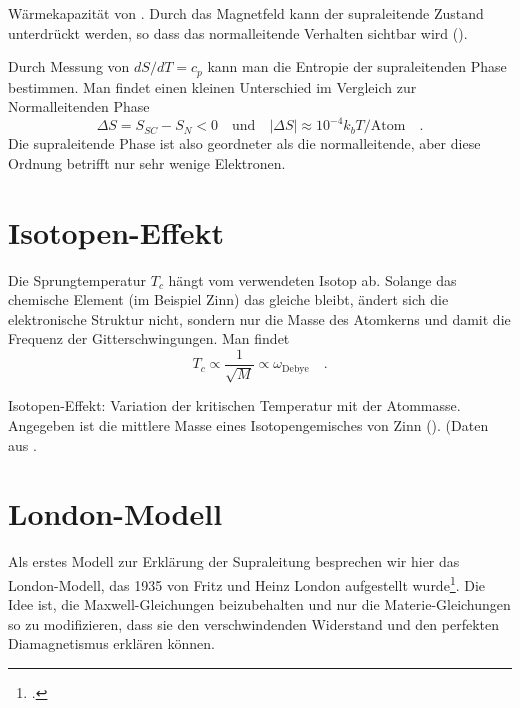 \begin{marginfigure}
    \caption{Wärmekapazität  von . Durch das Magnetfeld kann der supraleitende Zustand unterdrückt werden, so dass das  normalleitende Verhalten sichtbar wird (\cite{Phillips1959}).}
\end{marginfigure}



Durch Messung von $dS/ dT = c_p$ kann man die Entropie der supraleitenden Phase bestimmen. Man findet einen kleinen Unterschied im Vergleich zur Normalleitenden Phase
\begin{equation}
    \Delta S = S_{SC} - S_N < 0 \quad \text{und} \quad |\Delta S| \approx 10^{-4} k_b T / \text{Atom}
    \quad .
\end{equation} 
Die supraleitende Phase ist also geordneter als die normalleitende, aber diese Ordnung betrifft nur sehr wenige Elektronen.


\section*{Isotopen-Effekt}

Die Sprungtemperatur $T_c$ hängt vom verwendeten Isotop ab. Solange das chemische Element (im Beispiel Zinn) das gleiche bleibt, ändert sich die elektronische Struktur nicht, sondern nur die Masse des Atomkerns und damit die Frequenz der Gitterschwingungen. Man findet
\begin{equation}
    T_c \propto \frac{1}{\sqrt{M}} \propto \omega_\text{Debye} \quad .
\end{equation}


\begin{marginfigure}
    \caption{Isotopen-Effekt: Variation der kritischen Temperatur mit der Atommasse. Angegeben ist die mittlere Masse eines Isotopengemisches von Zinn (). (Daten aus  \cite{Hunklinger2014}. \label{fig:6_isotopeneffekt}}
\end{marginfigure}


\section*{London-Modell}

Als erstes Modell zur Erklärung der Supraleitung besprechen wir hier das London-Modell, das 1935 von Fritz und Heinz London aufgestellt wurde\footcite{London1935}. Die Idee ist, die Maxwell-Gleichungen beizubehalten und nur die Materie-Gleichungen so zu modifizieren, dass sie den verschwindenden Widerstand und den perfekten Diamagnetismus erklären können.

